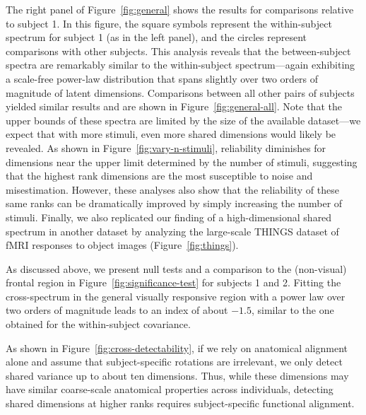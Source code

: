 \documentclass[10pt]{article}
\begin{document}
The right panel of Figure~\ref{fig:general} shows the results for comparisons relative to subject 1. In this figure, the square symbols represent the within-subject spectrum for subject 1 (as in the left panel), and the circles represent comparisons with other subjects. This analysis reveals that the between-subject spectra are remarkably similar to the within-subject spectrum---again exhibiting a scale-free power-law distribution that spans slightly over two orders of magnitude of latent dimensions. Comparisons between all other pairs of subjects yielded similar results and are shown in Figure~\ref{fig:general-all}. Note that the upper bounds of these spectra are limited by the size of the available dataset---we expect that with more stimuli, even more shared dimensions would likely be revealed. As shown in Figure~\ref{fig:vary-n-stimuli}, reliability diminishes for dimensions near the upper limit determined by the number of stimuli, suggesting that the highest rank dimensions are the most susceptible to noise and misestimation. However, these analyses also show that the reliability of these same ranks can be dramatically improved by simply increasing the number of stimuli. Finally, we also replicated our finding of a high-dimensional shared spectrum in another dataset by analyzing the large-scale THINGS dataset of fMRI responses to object images \autocite{Hebart2023} (Figure~\ref{fig:things}).

As discussed above, we present null tests and a comparison to the (non-visual) frontal region in Figure~\ref{fig:significance-test} for subjects 1 and 2. Fitting the cross-spectrum in the general visually responsive region with a power law over two orders of magnitude leads to an index of about \(-1.5\), similar to the one obtained for the within-subject covariance.

As shown in Figure~\ref{fig:cross-detectability}, if we rely on anatomical alignment alone and assume that subject-specific rotations are irrelevant, we only detect shared variance up to about ten dimensions. Thus, while these dimensions may have similar coarse-scale anatomical properties across individuals, detecting shared dimensions at higher ranks requires subject-specific functional alignment.
\end{document}
